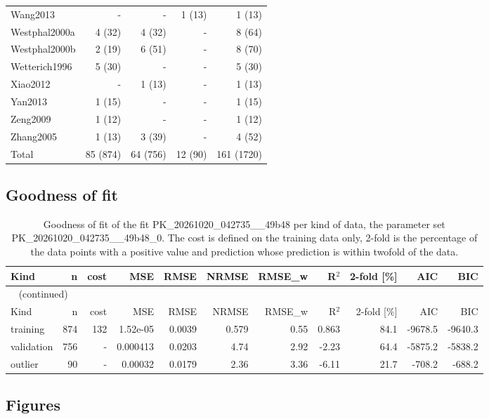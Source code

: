 \begin{longtable}{lrrrr}
Wang2013 & - & - & 1 (13) & 1 (13) \\
Westphal2000a & 4 (32) & 4 (32) & - & 8 (64) \\
Westphal2000b & 2 (19) & 6 (51) & - & 8 (70) \\
Wetterich1996 & 5 (30) & - & - & 5 (30) \\
Xiao2012 & - & 1 (13) & - & 1 (13) \\
Yan2013 & 1 (15) & - & - & 1 (15) \\
Zeng2009 & 1 (12) & - & - & 1 (12) \\
Zhang2005 & 1 (13) & 3 (39) & - & 4 (52) \\
Total & 85 (874) & 64 (756) & 12 (90) & 161 (1720) \\
\end{longtable}

\subsection{Goodness of fit}

\begin{longtable}{lrrrrrrrrrr}
\caption{Goodness of fit of the fit PK\_20261020\_042735\_\_49b48 per kind of data, the parameter set PK\_20261020\_042735\_\_49b48\_0. The cost is defined on the training data only, 2-fold is the percentage of the data points with a positive value and prediction whose prediction is within twofold of the data.}\label{tab:metrics:PK_20261020_042735__49b48} \\
\toprule
Kind & n & cost & MSE & RMSE & NRMSE & RMSE\_w & R\ensuremath{^{2}} & 2-fold [\%] & AIC & BIC \\
\midrule
\endfirsthead
\multicolumn{11}{l}{\small\tablename~\thetable{} (continued)} \\
\toprule
Kind & n & cost & MSE & RMSE & NRMSE & RMSE\_w & R\ensuremath{^{2}} & 2-fold [\%] & AIC & BIC \\
\midrule
\endhead
\bottomrule
\endlastfoot
training & 874 & 132 & 1.52e-05 & 0.0039 & 0.579 & 0.55 & 0.863 & 84.1 & -9678.5 & -9640.3 \\
validation & 756 & - & 0.000413 & 0.0203 & 4.74 & 2.92 & -2.23 & 64.4 & -5875.2 & -5838.2 \\
outlier & 90 & - & 0.00032 & 0.0179 & 2.36 & 3.36 & -6.11 & 21.7 & -708.2 & -688.2 \\
\end{longtable}

\subsection{Figures}

